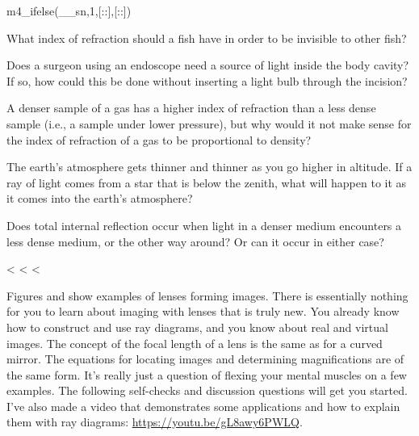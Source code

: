m4_ifelse(__sn,1,[::],[:\vspace{0mm plus 15mm}\pagebreak:])

\startdqs

\begin{dq}
What index of refraction should a fish have in order to
be invisible to other fish?
\end{dq}

\begin{dq}
Does a surgeon using an endoscope need a source of light
inside the body cavity? If so, how could this be done
without inserting a light bulb through the incision?
\end{dq}

\begin{dq}
A denser sample of a gas has a higher index of refraction
than a less dense sample (i.e., a sample under lower
pressure), but why would it not make sense for the index of
refraction of a gas to be proportional to density?
\end{dq}

\begin{dq}
The earth's atmosphere gets thinner and thinner as you go
higher in altitude. If a ray of light comes from a star
that is below the zenith, what will happen to it as it comes
into the earth's atmosphere?
\end{dq}

\begin{dq}
Does total internal reflection occur when light in a
denser medium encounters a less dense medium, or the other
way around? Or can it occur in either case?
\end{dq}

<%
<%
<%

Figures  and  show examples of lenses forming images.
There is essentially nothing for you to learn about imaging
with lenses that is truly new. You already know how to
construct and use ray diagrams, and you know about real and
virtual images. The concept of the focal length of a lens is
the same as for a curved mirror. The equations for locating
images and determining magnifications are of the same form.
It's really just a question of flexing your mental muscles
on a few examples. The following self-checks and discussion
questions will get you started.  I've also made a video that demonstrates
some applications and how to explain them with ray diagrams:
\url{https://youtu.be/gL8awy6PWLQ}.

